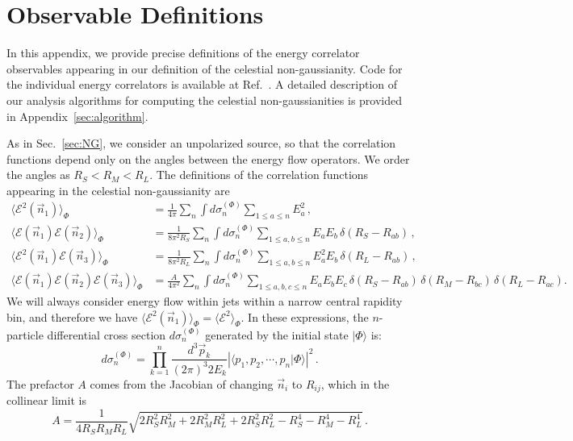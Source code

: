 \documentclass[letterpaper,11pt]{article}
\def\App#1{Appendix~\ref{#1}}
\DeclareRobustCommand{\Sec}[1]{Sec.~\ref{#1}}
\DeclareRobustCommand{\App}[1]{App.~\ref{#1}}
\DeclareRobustCommand{\Ref}[1]{Ref.~\cite{#1}}
\begin{document}
\appendix

\section{Observable Definitions}
\label{sec:def_app}

In this appendix, we provide precise definitions of the energy correlator observables appearing in our definition of the celestial non-gaussianity.
%
Code for the individual energy correlators is available at \Ref{EEC_github}. 
%
A detailed description of our analysis algorithms for computing the celestial non-gaussianities is provided in \App{sec:algorithm}.


As in \Sec{sec:NG}, we consider an unpolarized source, so that the correlation functions depend only on the angles between the energy flow operators.
%
We order the angles as $R_S<R_M<R_L$. The definitions of the correlation functions appearing in the celestial non-gaussianity are 
%
\begin{align}
%
\langle \mathcal{E}^2(\vec{n}_1)\rangle_\Phi 
&= \frac{1}{4\pi}\sum_n \int d\sigma^{(\Phi)}_n \sum_{1\leq a\leq n} E_a^2\, ,\\
%
\langle \mathcal{E}(\vec{n}_1) \mathcal{E}(\vec{n}_2)\rangle_\Phi 
&= \frac{1}{8 \pi^2 R_S} \sum_n \int d\sigma^{(\Phi)}_n \sum_{1\leq a, b\leq n} E_a E_b\, \delta(R_S - R_{ab})\,,\\
%
\langle \mathcal{E}^2(\vec{n}_1) \mathcal{E}(\vec{n}_3)\rangle_\Phi 
&= \frac{1}{8 \pi^2 R_L} \sum_n \int d\sigma^{(\Phi)}_n \sum_{1\leq a, b\leq n} E_a^2 E_b\, \delta(R_L - R_{ab})\,,\\
%
\langle \mathcal{E}(\vec{n}_1) \mathcal{E}(\vec{n}_2) \mathcal{E}(\vec{n}_3)\rangle_\Phi
&=\frac{A}{4\pi^2}  \sum_n \! \int \! d\sigma^{(\Phi)}_n \!\!\!\!\!\!\!
\sum_{1\leq a, b, c\leq n} \!\!\!\!\!\!
 E_a E_b E_c \, \delta(R_S \! - \! R_{ab}) \, \delta(R_M \!- \! R_{bc}) \, \delta(R_L \!- \! R_{ac}) .
\end{align}
%
We will always consider energy flow within jets within a narrow central rapidity bin, and therefore we have $\langle \mathcal{E}^2(\vec{n}_1)\rangle_\Phi 
=\langle \mathcal{E}^2\rangle_\Phi $.
%
In these expressions, the $n$-particle differential cross section $d\sigma_n^{(\Phi)}$ generated by the initial state $| \Phi \rangle$ is:
%
\begin{equation}
d\sigma_n^{(\Phi)}=\prod_{k=1}^{n} \frac{d^3\vec{p}_k}{(2\pi)^3 2E_k} \left| \langle p_1,p_2,\cdots, p_n | \Phi\rangle \right|^2\,.
\end{equation}
%
The prefactor $A$ comes from the Jacobian of changing $\vec{n}_i$ to $R_{ij}$, which in the collinear limit is
\begin{equation}
A = \frac{1}{4 R_S R_M R_L} \sqrt{2 R_S^2 R_M^2 + 2R_M^2 R_L^2 + 2 R_S^2 R_L^2 
-R_S^4 -R_M^4 -R_L^4}\, .
\end{equation}
%
\end{document}
